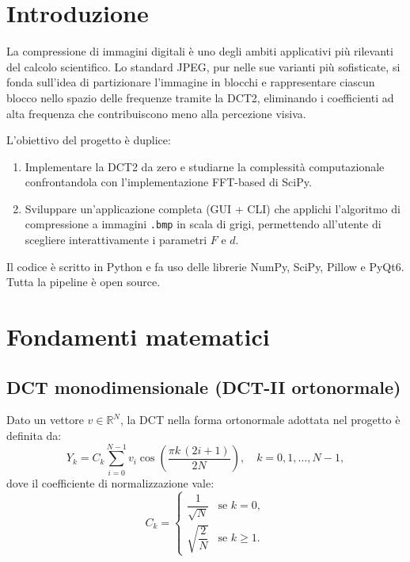 \documentclass[12pt,a4paper]{article}
\newcommand{\R}{\mathbb{R}}
\begin{document}
\section{Introduzione}

La compressione di immagini digitali è uno degli ambiti applicativi più rilevanti
del calcolo scientifico. Lo standard JPEG, pur nelle sue varianti più sofisticate,
si fonda sull'idea di partizionare l'immagine in blocchi e rappresentare ciascun
blocco nello spazio delle frequenze tramite la DCT2, eliminando i coefficienti ad
alta frequenza che contribuiscono meno alla percezione visiva.

L'obiettivo del progetto è duplice:
\begin{enumerate}
  \item Implementare la DCT2 da zero e studiarne la complessità computazionale
        confrontandola con l'implementazione FFT-based di SciPy.
  \item Sviluppare un'applicazione completa (GUI + CLI) che applichi l'algoritmo
        di compressione a immagini \texttt{.bmp} in scala di grigi, permettendo
        all'utente di scegliere interattivamente i parametri $F$ e $d$.
\end{enumerate}

Il codice è scritto in Python e fa uso delle librerie NumPy, SciPy, Pillow e
PyQt6. Tutta la pipeline è open source.

\section{Fondamenti matematici}

\subsection{DCT monodimensionale (DCT-II ortonormale)}

Dato un vettore $v \in \R^N$, la DCT nella forma ortonormale adottata nel
progetto è definita da:
\begin{equation}
  Y_k = C_k \sum_{i=0}^{N-1} v_i \cos\!\left(\frac{\pi k\,(2i+1)}{2N}\right),
  \quad k = 0, 1, \ldots, N-1,
  \label{eq:dct}
\end{equation}
dove il coefficiente di normalizzazione vale:
\begin{equation}
  C_k =
  \begin{cases}
    \dfrac{1}{\sqrt{N}}       & \text{se } k = 0,\\[6pt]
    \sqrt{\dfrac{2}{N}}       & \text{se } k \geq 1.
  \end{cases}
\end{equation}
\end{document}
